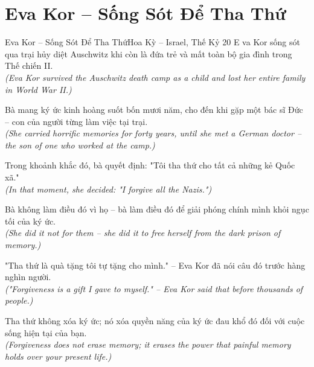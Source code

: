 \section{Eva Kor -- Sống Sót Để Tha Thứ}
\begin{truyen}{Eva Kor -- Sống Sót Để Tha Thứ}{Hoa Kỳ -- Israel, Thế Kỷ 20}
E va Kor sống sót qua trại hủy diệt Auschwitz khi còn là đứa trẻ và mất toàn bộ gia đình trong Thế chiến II.\\
\textit{(Eva Kor survived the Auschwitz death camp as a child and lost her entire family in World War II.)}

Bà mang ký ức kinh hoàng suốt bốn mươi năm, cho đến khi gặp một bác sĩ Đức -- con của người từng làm việc tại trại.\\
\textit{(She carried horrific memories for forty years, until she met a German doctor -- the son of one who worked at the camp.)}

Trong khoảnh khắc đó, bà quyết định: "Tôi tha thứ cho tất cả những kẻ Quốc xã."\\
\textit{(In that moment, she decided: "I forgive all the Nazis.")}

Bà không làm điều đó vì họ -- bà làm điều đó để giải phóng chính mình khỏi ngục tối của ký ức.\\
\textit{(She did it not for them -- she did it to free herself from the dark prison of memory.)}

"Tha thứ là quà tặng tôi tự tặng cho mình." -- Eva Kor đã nói câu đó trước hàng nghìn người.\\
\textit{("Forgiveness is a gift I gave to myself." -- Eva Kor said that before thousands of people.)}

\end{truyen}
\begin{baihoc}
  Tha thứ không xóa ký ức; nó xóa quyền năng của ký ức đau khổ đó đối với cuộc sống hiện tại của bạn.\\
  \textit{(Forgiveness does not erase memory; it erases the power that painful memory holds over your present life.)}
\end{baihoc}
